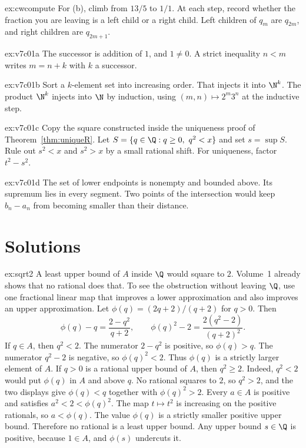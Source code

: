 \begin{hint}{ex:cwcompute}
For (b), climb from $13/5$ to $1/1$. At each step, record whether the fraction you are leaving is a left child or a right child. Left children of $q_m$ are $q_{2m}$, and right children are $q_{2m+1}$.
\end{hint}

\begin{hint}{ex:v7c01a}
The successor is addition of $1$, and $1\ne 0$. A strict inequality $n<m$ writes $m=n+k$ with $k$ a successor.
\end{hint}

\begin{hint}{ex:v7c01b}
Sort a $k$-element set into increasing order. That injects it into $\N^k$. The product $\N^k$ injects into $\N$ by induction, using $(m,n)\mapsto 2^m 3^n$ at the inductive step.
\end{hint}

\begin{hint}{ex:v7c01c}
Copy the square constructed inside the uniqueness proof of Theorem~\ref{thm:uniqueR}. Let $S=\{q\in\Q:q\ge 0,\ q^2<x\}$ and set $s=\sup S$. Rule out $s^2<x$ and $s^2>x$ by a small rational shift. For uniqueness, factor $t^2-s^2$.
\end{hint}

\begin{hint}{ex:v7c01d}
The set of lower endpoints is nonempty and bounded above. Its supremum lies in every segment. Two points of the intersection would keep $b_n-a_n$ from becoming smaller than their distance.
\end{hint}

\section{Solutions}

\begin{solution}{ex:sqrt2}
\idea A least upper bound of $A$ inside $\Q$ would square to $2$. Volume~1 already shows that no rational does that. To see the obstruction without leaving $\Q$, use one fractional linear map that improves a lower approximation and also improves an upper approximation.
\writeup Let $\phi(q)=(2q+2)/(q+2)$ for $q>0$. Then
\[
\phi(q)-q=\frac{2-q^2}{q+2},\qquad \phi(q)^2-2=\frac{2(q^2-2)}{(q+2)^2}.
\]
If $q\in A$, then $q^2<2$. The numerator $2-q^2$ is positive, so $\phi(q)>q$. The numerator $q^2-2$ is negative, so $\phi(q)^2<2$. Thus $\phi(q)$ is a strictly larger element of $A$. If $q>0$ is a rational upper bound of $A$, then $q^2\ge 2$. Indeed, $q^2<2$ would put $\phi(q)$ in $A$ and above $q$. No rational squares to $2$, so $q^2>2$, and the two displays give $\phi(q)<q$ together with $\phi(q)^2>2$. Every $a\in A$ is positive and satisfies $a^2<2<\phi(q)^2$. The map $t\mapsto t^2$ is increasing on the positive rationals, so $a<\phi(q)$. The value $\phi(q)$ is a strictly smaller positive upper bound. Therefore no rational is a least upper bound. Any upper bound $s\in\Q$ is positive, because $1\in A$, and $\phi(s)$ undercuts it.
\end{solution}

